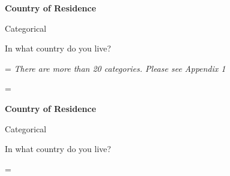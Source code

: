 \documentclass{article}
\newenvironment{absolutelynopagebreak}
  {\par\nobreak\vfil\penalty0\vfilneg
   \vtop\bgroup}
  {\par\xdef\tpd{\the\prevdepth}\egroup
   \prevdepth=\tpd}
\begin{document}
\setlength{\tabcolsep}{1em}
\setlength{\LTleft}{0pt}
\setlength{\LTright}{\fill}
\setlength{\LTcapwidth}{\textwidth}
\vspace{.25in}





\renewcommand{\listtablename}{Table of Contents}


\begin{absolutelynopagebreak}
\begin{absolutelynopagebreak}
\textbf{Country of Residence}\hfill\textbf{}

{\small Categorical}

\vskip 0.10in
In what country do you live?
\vskip 0.10in\end{absolutelynopagebreak} \textit{There are more than 20 categories. Please see Appendix 1}\end{absolutelynopagebreak}

\clearpage

\clearpage
\fancyhead{}

\begin{absolutelynopagebreak}
\textbf{Country of Residence}\hfill\textbf{}

{\small Categorical}

\vskip 0.10in
In what country do you live?
\vskip 0.10in\end{absolutelynopagebreak}
\end{document}
